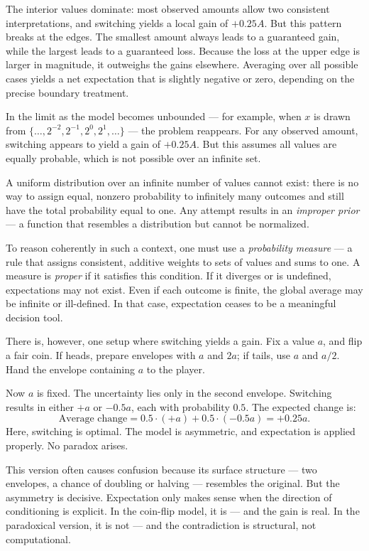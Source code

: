 The interior values dominate: most observed amounts allow two consistent interpretations, and switching yields a local gain of \( +0.25A \). But this pattern breaks at the edges. The smallest amount always leads to a guaranteed gain, while the largest leads to a guaranteed loss. Because the loss at the upper edge is larger in magnitude, it outweighs the gains elsewhere. Averaging over all possible cases yields a net expectation that is slightly negative or zero, depending on the precise boundary treatment.

In the limit as the model becomes unbounded — for example, when \( x \) is drawn from \( \{\dots, 2^{-2}, 2^{-1}, 2^0, 2^1, \dots\} \) — the problem reappears. For any observed amount, switching appears to yield a gain of \( +0.25A \). But this assumes all values are equally probable, which is not possible over an infinite set.

A uniform distribution over an infinite number of values cannot exist: there is no way to assign equal, nonzero probability to infinitely many outcomes and still have the total probability equal to one. Any attempt results in an \emph{improper prior} — a function that resembles a distribution but cannot be normalized.

To reason coherently in such a context, one must use a \emph{probability measure} — a rule that assigns consistent, additive weights to sets of values and sums to one. A measure is \emph{proper} if it satisfies this condition. If it diverges or is undefined, expectations may not exist. Even if each outcome is finite, the global average may be infinite or ill-defined. In that case, expectation ceases to be a meaningful decision tool.

There is, however, one setup where switching yields a gain. Fix a value \( a \), and flip a fair coin. If heads, prepare envelopes with \( a \) and \( 2a \); if tails, use \( a \) and \( a/2 \). Hand the envelope containing \( a \) to the player.

Now \( a \) is fixed. The uncertainty lies only in the second envelope. Switching results in either \( +a \) or \( -0.5a \), each with probability \( 0.5 \). The expected change is:
\[
\text{Average change} = 0.5 \cdot (+a) + 0.5 \cdot (-0.5a) = +0.25a.
\]
Here, switching is optimal. The model is asymmetric, and expectation is applied properly. No paradox arises.

This version often causes confusion because its surface structure — two envelopes, a chance of doubling or halving — resembles the original. But the asymmetry is decisive. Expectation only makes sense when the direction of conditioning is explicit. In the coin-flip model, it is — and the gain is real. In the paradoxical version, it is not — and the contradiction is structural, not computational.

